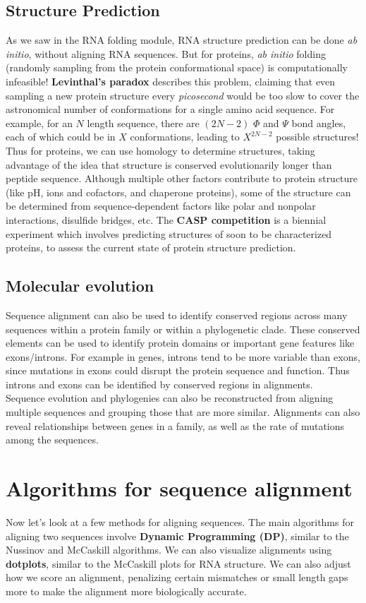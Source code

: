 \documentclass[12pt]{article}
\begin{document}
\subsection{Structure Prediction}
As we saw in the RNA folding module, RNA structure prediction can be done \textit{ab initio}, without aligning RNA sequences. But for proteins, \textit{ab initio} folding (randomly sampling from the protein conformational space) is computationally infeasible! \textbf{Levinthal's paradox} describes this problem, claiming that even sampling a new protein structure every \textit{picosecond} would be too slow to cover the astronomical number of conformations for a single amino acid sequence. For example, for an $N$ length sequence, there are $(2N-2)$ $\Phi$ and $\Psi$ bond angles, each of which could be in $X$ conformations, leading to $X^{2N-2}$ possible structures!\\[10pt]
Thus for proteins, we can use homology to determine structures, taking advantage of the idea that structure is conserved evolutionarily longer than peptide sequence. Although multiple other factors contribute to protein structure (like pH, ions and cofactors, and chaperone proteins), some of the structure can be determined from sequence-dependent factors like polar and nonpolar interactions, disulfide bridges, etc. The \textbf{CASP competition} is a biennial experiment which involves predicting structures of soon to be characterized proteins, to assess the current state of protein structure prediction.

\subsection{Molecular evolution}
Sequence alignment can also be used to identify conserved regions across many sequences within a protein family or within a phylogenetic clade. These conserved elements can be used to identify protein domains or important gene features like exons/introns. For example in genes, introns tend to be more variable than exons, since mutations in exons could disrupt the protein sequence and function. Thus introns and exons can be identified by conserved regions in alignments.\\[10pt]
Sequence evolution and phylogenies can also be reconstructed from aligning multiple sequences and grouping those that are more similar. Alignments can also reveal relationships between genes in a family, as well as the rate of mutations among the sequences.

\section{Algorithms for sequence alignment}
Now let's look at a few methods for aligning sequences. The main algorithms for aligning two sequences involve \textbf{Dynamic Programming (DP)}, similar to  the Nussinov and McCaskill algorithms. We can also visualize alignments using \textbf{dotplots}, similar to the McCaskill plots for RNA structure. We can also adjust how we score an alignment, penalizing certain mismatches or small length gaps more to make the alignment more biologically accurate.
\end{document}
